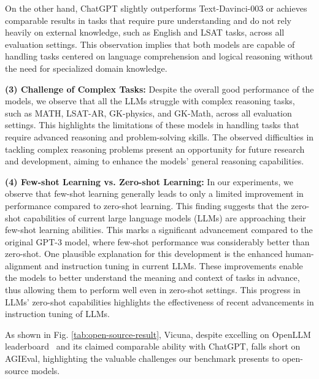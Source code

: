 On the other hand, ChatGPT slightly outperforms Text-Davinci-003 or achieves comparable results in tasks that require pure understanding and do not rely heavily on external knowledge, such as English and LSAT tasks, across all evaluation settings. This observation implies that both models are capable of handling tasks centered on language comprehension and logical reasoning without the need for specialized domain knowledge.
 \par{\textbf{(3) Challenge of Complex Tasks:}} Despite the overall good performance of the models, we observe that all the LLMs struggle with complex reasoning tasks, such as MATH, LSAT-AR, GK-physics, and GK-Math, across all evaluation settings. This highlights the limitations of these models in handling tasks that require advanced reasoning and problem-solving skills. The observed difficulties in tackling complex reasoning problems present an opportunity for future research and development, aiming to enhance the models' general reasoning capabilities.
 \par{\textbf{(4) Few-shot Learning vs. Zero-shot Learning:}} In our experiments, we observe that few-shot learning generally leads to only a limited improvement in performance compared to zero-shot learning. This finding suggests that the zero-shot capabilities of current large language models (LLMs) are approaching their few-shot learning abilities. This marks a significant advancement compared to the original GPT-3 \citep{brown2020language} model, where few-shot performance was considerably better than zero-shot. One plausible explanation for this development is the enhanced human-alignment and instruction tuning in current LLMs. These improvements enable the models to better understand the meaning and context of tasks in advance, thus allowing them to perform well even in zero-shot settings. This progress in LLMs' zero-shot capabilities highlights the effectiveness of recent advancements in instruction tuning of LLMs.

As shown in Fig. \ref{tab:open-source-result}, Vicuna, despite excelling on OpenLLM leaderboard~\citep{open-llm-leaderboard} and its claimed comparable ability with ChatGPT, falls short on AGIEval, highlighting the valuable challenges our benchmark presents to open-source models.
